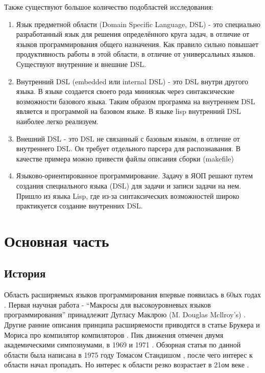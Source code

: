 \documentclass[a4paper,12pt]{article}
\begin{document}
Также существуют большое количество подобластей исследования:
\begin{enumerate}
  \item Язык предметной области (Domain Specific Language, DSL) - это
  специально разработанный язык для решения определённого круга задач, в
  отличие от языков программирования общего назначения. Как правило
  сильно повышает продуктивность работы в этой области, в отличие от
  универсальных языков. Существуют внутренние и внешние DSL.
  \item Внутренний DSL (embedded или internal DSL) - это DSL внутри другого
  языка. В языке создается своего рода миниязык через синтаксические
  возможности базового языка. Таким образом программа на внутреннем DSL
  является и программой на базовом языке. В языке lisp внутренний DSL наиболее
  легко реализуем.
  \item Внешний DSL - это DSL не связанный с базовым языком, в отличие от
  внутреннего DSL. Он требует отдельного парсера для распознавания. В качестве
  примера можно привести файлы описания сборки (makefile)
  \item Языково-ориентированное программирование. Задачу в ЯОП решают путем
  создания специального языка (DSL) для задачи и записи задачи на нем. Пришло
  из языка Lisp, где из-за синтаксических возможностей широко практикуется
  создание внутренних DSL.
\end{enumerate}

\section{Основная часть}

\subsection{История}
Область расширяемых языков программирования впервые появилась в 60ых годах
\cite{hist69}. Первая научная работа - ``Макросы для высокоуровневых языков
программирования'' принадлежит Дугласу Маклрою (M. Douglas Mcllroy's)
\cite{macro60}. Другие ранние описания принципа расширяемости приводятся в
статье Брукера и Мориса про компилятор компиляторов \cite{cc60}.
Пик движения отмечен двумя академическими симпозиумами, в 1969 \cite{proc69} и 1971
\cite{proc71}. Обзорная статья по данной области была написана в 1975 году
Томасом Стандишом \cite{Stan75}, после чего интерес к области начал пропадать.
Но интерес к области резко возрастает в 21ом веке \cite{Ext2105}.
\end{document}
